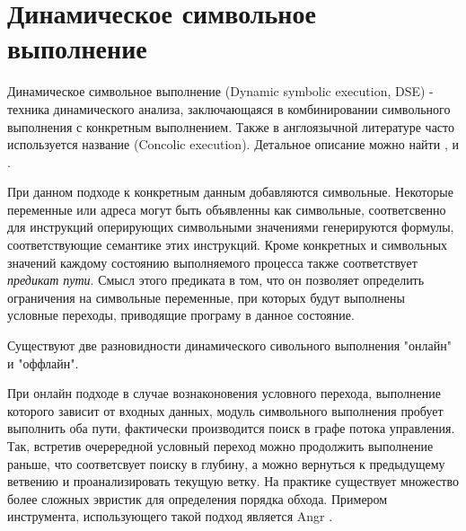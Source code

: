 



\section{Динамическое символьное выполнение}

Динамическое символьное выполнение (Dynamic symbolic execution, DSE) - техника динамического анализа, заключающаяся в комбинировании символьного выполнения с конкретным выполнением. Также в англоязычной литературе часто используется название (Concolic execution). Детальное описание можно найти \cite{Schwartz}, \cite{PBA} и \cite{SurveySymExec}.

При данном подходе к конкретным данным добавляются символьные. Некоторые переменные или адреса могут быть объявленны как символьные, соответсвенно для инструкций оперирующих символьными значениями генерируются формулы, соответствующие семантике этих инструкций. Кроме конкретных и символьных значений каждому состоянию выполняемого процесса также соответствует \emph{предикат пути}. Смысл этого предиката в том, что он позволяет определить ограничения на символьные переменные, при которых будут выполнены условные переходы, приводящие програму в данное состояние.

Существуют две разновидности динамического сивольного выполнения "онлайн" и "оффлайн".

При онлайн подходе в случае вознаконовения условного перехода, выполнение которого зависит от входных данных, модуль символьного выполнения пробует выполнить оба пути, фактически производится поиск в графе потока управления. Так, встретив очерередной условный переход можно продолжить выполнение раньше, что соответсвует поиску в глубину, а можно вернуться к предыдущему ветвению и проанализировать текущую ветку. На практике существует множество более сложных эвристик для определения порядка обхода.
Примером инструмента, использующего такой подход является Angr \cite{Angr}.

